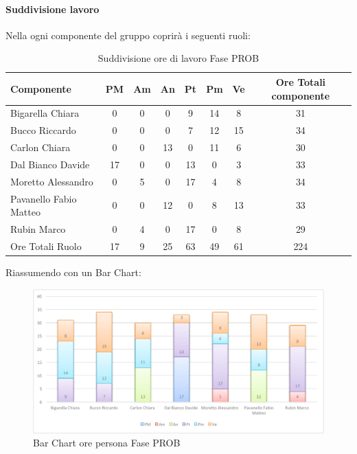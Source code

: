 			\paragraph{Suddivisione lavoro}
				Nella  ogni componente del gruppo \groupname{} coprirà i seguenti ruoli:
				\begin{table}[H]
					\begin{center}
						\begin{tabular}{| l | c | c | c | c | c | c | c |}
							\hline
							Componente 				& PM	& Am 	& An 	& Pt 		& Pm 	& Ve 	& Ore Totali componente \\ \hline
							
							Bigarella Chiara 			& 0		& 0		& 0		& 9 		& 14 		& 8 		& 31 \\
							Bucco Riccardo 			& 0		& 0		& 0		& 7 		& 12		& 15 		& 34 \\
							Carlon Chiara	 			& 0		& 0		& 13 		& 0		& 11 		& 6 		& 30 \\
							Dal Bianco Davide 			& 17 		& 0		& 0		& 13 		& 0		& 3 		& 33 \\
							Moretto Alessandro 			& 0		& 5 		& 0		& 17 		& 4 		& 8 		& 34 \\
							Pavanello Fabio Matteo	 	& 0		& 0		& 12 		& 0		& 8 		& 13 		& 33 \\
							Rubin Marco				& 0		& 4 		& 0		& 17 		& 0		& 8 		& 29 \\ \hline \hline
							
							Ore Totali Ruolo 			& 17 		& 9 		& 25 		& 63 		& 49 		& 61 		& 224	\\ \hline
						\end{tabular}
					\end{center}
					\caption{Suddivisione ore di lavoro Fase PROB}
				\end{table}
				Riassumendo con un Bar Chart:
				\begin{figure}[H]\centering
					\includegraphics[width=\textwidth]{PianoDiProgetto/Pics/ChartOreFasePROB.pdf}
					\caption{Bar Chart ore persona Fase PROB}
				\end{figure}
